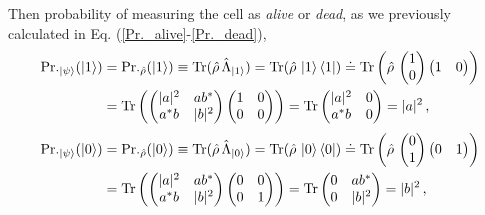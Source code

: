 \documentclass[11pt]{article}
\numberwithin{equation}{section} %
\numberwithin{figure}{section} %
\begin{document}
\begin{appendices}
Then probability of measuring the cell as \emph{alive} or \emph{dead}, as we previously calculated in Eq. (\ref{Pr._alive}-\ref{Pr._dead}),
\begin{equation} \label{Pr._alive_with_rho}
\begin{split}
\textrm{Pr.}_{\ket{\psi}} (\ket{1}) & =\textrm{Pr.}_{\hat{\rho}}(\ket{1})\equiv \textrm{Tr}(\hat{\rho}\,\hat{\Lambda}_{\ket{1}}) = \textrm{Tr}(\hat{\rho}\,\ket{1}\bra{1}) \doteq \textrm{Tr}\left(\hat{\rho}\,\begin{pmatrix}1\\0\end{pmatrix}\begin{pmatrix}1&0\end{pmatrix}\right)\\
& =\textrm{Tr}\left(\begin{pmatrix} |a|^2&ab^* \\ a^*b&|b|^2 \end{pmatrix}\begin{pmatrix}1&0\\0&0\end{pmatrix}\right)=\textrm{Tr}\begin{pmatrix} |a|^2&0 \\ a^*b&0 \end{pmatrix}=|a|^2\,\textrm{,}
\end{split}
\end{equation}
\begin{equation} \label{Pr._dead_with_rho}
\begin{split}
\textrm{Pr.}_{\ket{\psi}} (\ket{0}) & =\textrm{Pr.}_{\hat{\rho}}(\ket{0})\equiv \textrm{Tr}(\hat{\rho}\,\hat{\Lambda}_{\ket{0}}) = \textrm{Tr}(\hat{\rho}\,\ket{0}\bra{0}) \doteq \textrm{Tr}\left(\hat{\rho}\,\begin{pmatrix}0\\1\end{pmatrix}\begin{pmatrix}0&1\end{pmatrix}\right)\\
& =\textrm{Tr}\left(\begin{pmatrix} |a|^2&ab^* \\ a^*b&|b|^2 \end{pmatrix}\begin{pmatrix}0&0\\0&1\end{pmatrix}\right)=\textrm{Tr}\begin{pmatrix} 0&ab^* \\ 0&|b|^2 \end{pmatrix}=|b|^2\,\textrm{,}
\end{split}
\end{equation}


\end{appendices}
\end{document}
